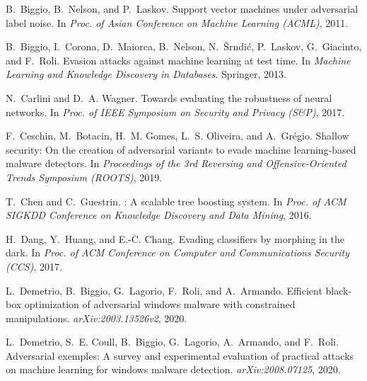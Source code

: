 \documentclass[conference]{IEEEtran}
\begin{document}
{\begin{thebibliography}{47}
	B.~Biggio, B.~Nelson, and P.~Laskov.
	\newblock Support vector machines under adversarial label noise.
	\newblock In \emph{Proc. of Asian Conference on Machine Learning 
	{(ACML)}},
	2011.
	
	B.~Biggio, I.~Corona, D.~Maiorca, B.~Nelson, N.~{\v{S}}rndi{\'{c}}, 
	P.~Laskov,
	G.~Giacinto, and F.~Roli.
	\newblock Evasion attacks against machine learning at test time.
	\newblock In \emph{Machine Learning and Knowledge Discovery in 
	Databases}.
	Springer, 2013.
	
	N.~Carlini and D.~A. Wagner.
	\newblock Towards evaluating the robustness of neural networks.
	\newblock In \emph{Proc. of {IEEE} Symposium on Security and 
	Privacy ({S\&P})},
	2017.
		
	F.~Ceschin, M.~Botacin, H.~M. Gomes, L.~S. Oliveira, and 
	A.~Gr\'{e}gio.
	\newblock Shallow security: On the creation of adversarial variants 
	to evade
	machine learning-based malware detectors.
	\newblock In \emph{Proceedings of the 3rd Reversing and 
	Offensive-Oriented
		Trends Symposium (ROOTS)}, 2019.
	
	T.~Chen and C.~Guestrin.
	: {A} scalable tree boosting system.
	\newblock In \emph{Proc. of ACM SIGKDD Conference on Knowledge 
	Discovery and
		Data Mining}, 2016.
	
	H.~Dang, Y.~Huang, and E.-C. Chang.
	\newblock Evading classifiers by morphing in the dark.
	\newblock In \emph{Proc. of {ACM} Conference on Computer and 
	Communications
		Security ({CCS})}, 2017.
	
	L.~Demetrio, B.~Biggio, G.~Lagorio, F.~Roli, and A.~Armando.
	\newblock Efficient black-box optimization of adversarial windows 
	malware with
	constrained manipulations.
	\newblock \emph{arXiv:2003.13526v2}, 2020{}.
	
	L.~Demetrio, S.~E. Coull, B.~Biggio, G.~Lagorio, A.~Armando, and 
	F.~Roli.
	\newblock Adversarial exemples: A survey and experimental 
	evaluation of
	practical attacks on machine learning for windows malware detection.
	\newblock \emph{arXiv:2008.07125}, 2020{}.
	

\end{thebibliography}}
\end{document}
